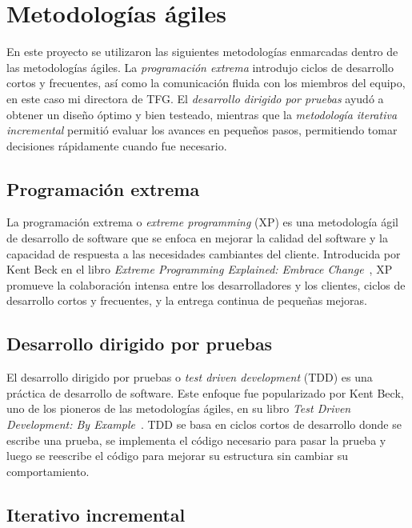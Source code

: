 \section{Metodologías ágiles}

En este proyecto se utilizaron las siguientes metodologías enmarcadas dentro de las metodologías ágiles.
La \textit{programación extrema} introdujo ciclos de desarrollo cortos y frecuentes, así como la comunicación
fluida con los miembros del equipo, en este caso mi directora de TFG.
El \textit{desarrollo dirigido por pruebas} ayudó a obtener un diseño óptimo y bien testeado, mientras que la
\textit{metodología iterativa incremental} permitió evaluar los avances en pequeños pasos, permitiendo tomar
decisiones rápidamente cuando fue necesario.

\subsection*{Programación extrema}

La programación extrema o \textit{extreme programming} (XP) es una metodología ágil de desarrollo de software que se
enfoca en mejorar la calidad del software y la capacidad de respuesta a las necesidades cambiantes del cliente.
Introducida por Kent Beck en el libro \textit{Extreme Programming Explained: Embrace Change}~\cite{book_beck_1999},
XP promueve la colaboración intensa entre los desarrolladores y los clientes, ciclos de desarrollo cortos y frecuentes,
y la entrega continua de pequeñas mejoras.

\subsection*{Desarrollo dirigido por pruebas}

El desarrollo dirigido por pruebas o \textit{test driven development} (TDD) es una práctica de desarrollo de software.
Este enfoque fue popularizado por Kent Beck, uno de los pioneros de las metodologías ágiles, en su libro
\textit{Test Driven Development: By Example}~\cite{book_beck_2003}.
TDD se basa en ciclos cortos de desarrollo donde se escribe una prueba, se implementa el código necesario para pasar la
prueba y luego se reescribe el código para mejorar su estructura sin cambiar su comportamiento.

\subsection*{Iterativo incremental}\label{subsec:iterativo_incremental}

